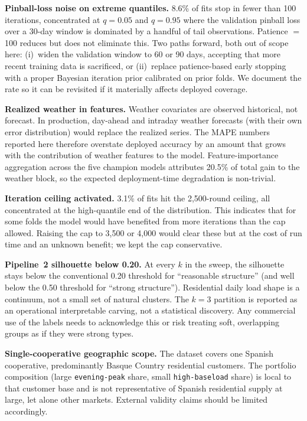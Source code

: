 \documentclass[11pt]{article}
\begin{document}
\textbf{Pinball-loss noise on extreme quantiles.} 8.6\% of fits stop in
fewer than 100 iterations, concentrated at $q = 0.05$ and $q = 0.95$
where the validation pinball loss over a 30-day window is dominated by a
handful of tail observations. Patience $=$ 100 reduces but does not
eliminate this. Two paths forward, both out of scope here: (i)~widen the
validation window to 60 or 90 days, accepting that more recent training
data is sacrificed, or (ii)~replace patience-based early stopping with a
proper Bayesian iteration prior calibrated on prior folds. We document the
rate so it can be revisited if it materially affects deployed coverage.

\textbf{Realized weather in features.} Weather covariates are observed
historical, not forecast. In production, day-ahead and intraday weather
forecasts (with their own error distribution) would replace the realized
series. The MAPE numbers reported here therefore overstate deployed
accuracy by an amount that grows with the contribution of weather features
to the model. Feature-importance aggregation across the five champion
models attributes 20.5\% of total gain to the weather block, so the
expected deployment-time degradation is non-trivial.

\textbf{Iteration ceiling activated.} 3.1\% of fits hit the 2{,}500-round
ceiling, all concentrated at the high-quantile end of the distribution.
This indicates that for some folds the model would have benefited from
more iterations than the cap allowed. Raising the cap to 3{,}500 or
4{,}000 would clear these but at the cost of run time and an unknown
benefit; we kept the cap conservative.

\textbf{Pipeline~2 silhouette below 0.20.} At every $k$ in the sweep, the
silhouette stays below the conventional 0.20 threshold for ``reasonable
structure'' (and well below the 0.50 threshold for ``strong structure'').
Residential daily load shape is a continuum, not a small set of natural
clusters. The $k = 3$ partition is reported as an operational
interpretable carving, not a statistical discovery. Any commercial use of
the labels needs to acknowledge this or risk treating soft, overlapping
groups as if they were strong types.

\textbf{Single-cooperative geographic scope.} The dataset covers one
Spanish cooperative, predominantly Basque Country residential customers.
The portfolio composition (large \texttt{evening-peak} share, small
\texttt{high-baseload} share) is local to that customer base and is not
representative of Spanish residential supply at large, let alone other
markets. External validity claims should be limited accordingly.
\end{document}
